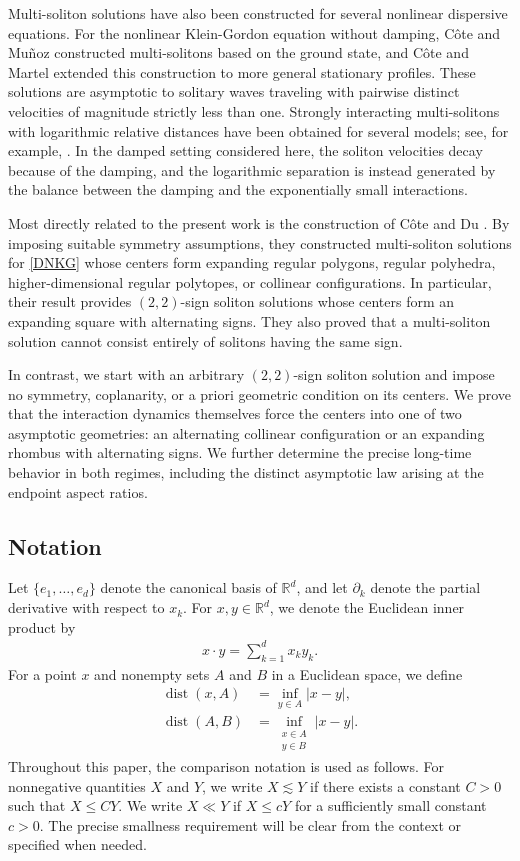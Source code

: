 \documentclass[10pt,a4paper]{amsart}
\numberwithin{equation}{section}
\begin{document}
Multi-soliton solutions have also been constructed for several nonlinear dispersive equations. For the nonlinear Klein-Gordon equation without damping, C\^{o}te and Mu\~{n}oz \cite{CM} constructed multi-solitons based on the ground state, and C\^{o}te and Martel \cite{CM1} extended this construction to more general stationary profiles. These solutions are asymptotic to solitary waves traveling with pairwise distinct velocities of magnitude strictly less than one. Strongly interacting multi-solitons with logarithmic relative distances have been obtained for several models; see, for example, \cite{A,GI,MN,N1,N2}. In the damped setting considered here, the soliton velocities decay because of the damping, and the logarithmic separation is instead generated by the balance between the damping and the exponentially small interactions.

Most directly related to the present work is the construction of C\^{o}te and Du \cite{CD}. By imposing suitable symmetry assumptions, they constructed multi-soliton solutions for \eqref{DNKG} whose centers form expanding regular polygons, regular polyhedra, higher-dimensional regular polytopes, or collinear configurations. In particular, their result provides $(2,2)$-sign soliton solutions whose centers form an expanding square with alternating signs. They also proved that a multi-soliton solution cannot consist entirely of solitons having the same sign.

In contrast, we start with an arbitrary $(2,2)$-sign soliton solution and impose no symmetry, coplanarity, or a priori geometric condition on its centers. We prove that the interaction dynamics themselves force the centers into one of two asymptotic geometries: an alternating collinear configuration or an expanding rhombus with alternating signs. We further determine the precise long-time behavior in both regimes, including the distinct asymptotic law arising at the endpoint aspect ratios. 

\subsection{Notation}

Let $\{e_1,\ldots,e_d\}$ denote the canonical basis of $\mathbb{R}^d$, and let ${\partial}_k$ denote the partial derivative
with respect to $x_k$. For $x,y\in\mathbb{R}^d$, we denote the Euclidean inner product by
\begin{align}\label{Euclideanproduct}
x\cdot y=\sum_{k=1}^d x_k y_k.
\end{align}
For a point $x$ and nonempty sets $A$ and $B$ in a Euclidean space, we define
\begin{align*}
\operatorname{dist}(x,A)
&=\inf_{y\in A}|x-y|,
\\
\operatorname{dist}(A,B)
&=\inf_{\substack{x\in A\\y\in B}}|x-y|.
\end{align*}
Throughout this paper, the comparison notation is used as follows. For nonnegative quantities $X$ and $Y$, we write $X\lesssim Y$ if there exists a constant $C>0$ such that $X\leq CY$. We write $X\ll Y$ if $X\leq cY$ for a sufficiently small constant $c>0$. The precise smallness requirement will be clear from the context or specified when needed.
\end{document}
